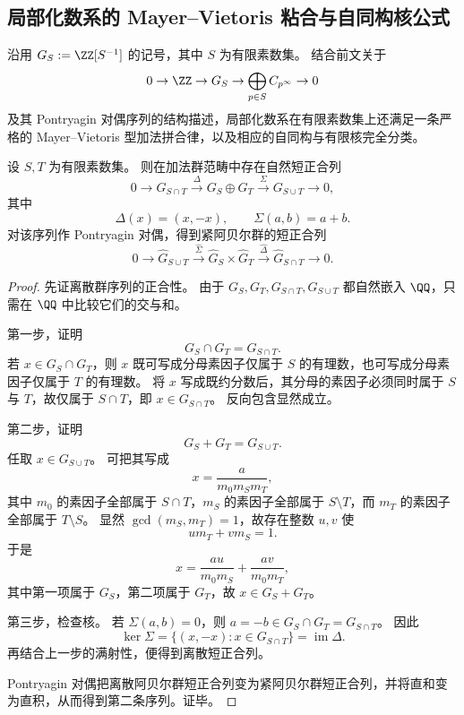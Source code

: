 \subsection{局部化数系的 Mayer--Vietoris 粘合与自同构核公式}\label{subsec:conclusion-localized-groups-mayer-vietoris-end-kernel}
沿用 \(G_S:=\ZZ[S^{-1}]\) 的记号，其中 \(S\) 为有限素数集。
结合前文关于
\[
0\to \ZZ\to G_S\to \bigoplus_{p\in S}C_{p^\infty}\to 0
\]
及其 Pontryagin 对偶序列的结构描述，局部化数系在有限素数集上还满足一条严格的 Mayer--Vietoris 型加法拼合律，以及相应的自同构与有限核完全分类。

\begin{theorem}\label{thm:conclusion-localized-groups-mayer-vietoris}
设 \(S,T\) 为有限素数集。
则在加法群范畴中存在自然短正合列
\[
0\longrightarrow G_{S\cap T}
\overset{\Delta}{\longrightarrow}
G_S\oplus G_T
\overset{\Sigma}{\longrightarrow}
G_{S\cup T}
\longrightarrow 0,
\]
其中
\[
\Delta(x)=(x,-x),
\qquad
\Sigma(a,b)=a+b.
\]
对该序列作 Pontryagin 对偶，得到紧阿贝尔群的短正合列
\[
0\longrightarrow \widehat G_{S\cup T}
\overset{\widehat\Sigma}{\longrightarrow}
\widehat G_S\times \widehat G_T
\overset{\widehat\Delta}{\longrightarrow}
\widehat G_{S\cap T}
\longrightarrow 0.
\]
\end{theorem}
\begin{proof}
先证离散群序列的正合性。
由于 \(G_S,G_T,G_{S\cap T},G_{S\cup T}\) 都自然嵌入 \(\QQ\)，只需在 \(\QQ\) 中比较它们的交与和。

第一步，证明
\[
G_S\cap G_T=G_{S\cap T}.
\]
若 \(x\in G_S\cap G_T\)，则 \(x\) 既可写成分母素因子仅属于 \(S\) 的有理数，也可写成分母素因子仅属于 \(T\) 的有理数。
将 \(x\) 写成既约分数后，其分母的素因子必须同时属于 \(S\) 与 \(T\)，故仅属于 \(S\cap T\)，即 \(x\in G_{S\cap T}\)。
反向包含显然成立。

第二步，证明
\[
G_S+G_T=G_{S\cup T}.
\]
任取 \(x\in G_{S\cup T}\)。
可把其写成
\[
x=\frac{a}{m_0m_Sm_T},
\]
其中 \(m_0\) 的素因子全部属于 \(S\cap T\)，\(m_S\) 的素因子全部属于 \(S\setminus T\)，而 \(m_T\) 的素因子全部属于 \(T\setminus S\)。
显然 \(\gcd(m_S,m_T)=1\)，故存在整数 \(u,v\) 使
\[
um_T+vm_S=1.
\]
于是
\[
x=\frac{au}{m_0m_S}+\frac{av}{m_0m_T},
\]
其中第一项属于 \(G_S\)，第二项属于 \(G_T\)，故 \(x\in G_S+G_T\)。

第三步，检查核。
若 \(\Sigma(a,b)=0\)，则 \(a=-b\in G_S\cap G_T=G_{S\cap T}\)。
因此
\[
\ker\Sigma=\{(x,-x):x\in G_{S\cap T}\}=\operatorname{im}\Delta.
\]
再结合上一步的满射性，便得到离散短正合列。

Pontryagin 对偶把离散阿贝尔群短正合列变为紧阿贝尔群短正合列，并将直和变为直积，从而得到第二条序列。证毕。
\end{proof}

